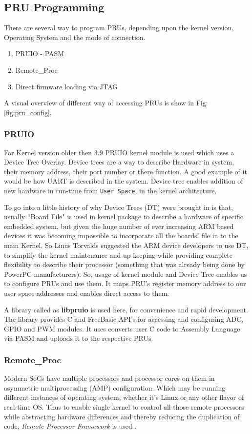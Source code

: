 \subsection{PRU Programming}
There are several way to program PRUs, depending upon the kernel version, Operating System and the mode of connection.
\begin{enumerate}
	\item PRUIO - PASM 
	\item Remote\_Proc
	\item Direct firmware loading via JTAG
\end{enumerate}

A visual overview of different way of accessing PRUs is show in Fig: \ref{fig:pru_config}.
\subsubsection{PRUIO}
 For Kernel version older then 3.9 PRUIO kernel module is used which uses a Device Tree Overlay. Device trees are a way to describe Hardware in system, their memory address, their port number or there function. A good example of it would be how UART is described in the system. Device tree enables addition of new hardware in run-time from \texttt{User Space}, in the kernel architecture. 
 
 To go into a little history of why Device Trees (DT) were brought in is that, usually ``Board File" is used in kernel package to describe a hardware of specific embedded system, but given the huge number of ever increasing ARM based devices it was becoming impossible to incorporate all the boards' file in to the main Kernel. So Linus Torvalds \cite{DThist} suggested the ARM device developers to use DT, to simplify the kernel maintenance and up-keeping while providing complete flexibility to describe their processor (something that was already being done by PowerPC manufacturers). So, usage of kernel module and Device Tree enables us to configure PRUs and use them. It maps PRU's register memory address to our user space addresses and enables direct access to them. 
 
 A library  called as \textbf{libpruio} \cite{libpruio} is used here, for convenience and rapid development. The library provides C and FreeBasic API's for accessing and configuring ADC, GPIO and PWM modules. It uses converts user C code to Assembly Language via PASM and uploads it to the respective PRUs.
 
 \subsubsection{Remote\_Proc}
 Modern SoCs have multiple processors and processor cores on them in asymmetric multiprocessing (AMP) configuration. Which may be running different instances  of operating system, whether it's Linux or any other flavor of real-time OS. Thus to enable single kernel to control all those remote processors while abstracting hardware differences and thereby reducing the duplication of code, \emph{Remote Processor Framework} is used \cite{remoteproc}.
 

